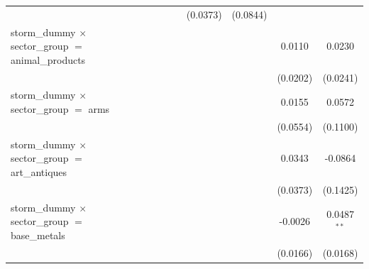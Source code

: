 \begin{tabular}{lcccccccc}
                                                                                  &                       &                       &                       &                       & (0.0373)              & (0.0844)              &                       &   \\   
   storm\_dummy $\times$ sector\_group $=$ animal\_products                       &                       &                       &                       &                       &                       &                       & 0.0110                & 0.0230\\   
                                                                                  &                       &                       &                       &                       &                       &                       & (0.0202)              & (0.0241)\\   
   storm\_dummy $\times$ sector\_group $=$ arms                                   &                       &                       &                       &                       &                       &                       & 0.0155                & 0.0572\\   
                                                                                  &                       &                       &                       &                       &                       &                       & (0.0554)              & (0.1100)\\   
   storm\_dummy $\times$ sector\_group $=$ art\_antiques                          &                       &                       &                       &                       &                       &                       & 0.0343                & -0.0864\\   
                                                                                  &                       &                       &                       &                       &                       &                       & (0.0373)              & (0.1425)\\   
   storm\_dummy $\times$ sector\_group $=$ base\_metals                           &                       &                       &                       &                       &                       &                       & -0.0026               & 0.0487$^{**}$\\   
                                                                                  &                       &                       &                       &                       &                       &                       & (0.0166)              & (0.0168)\\   

\end{tabular}
